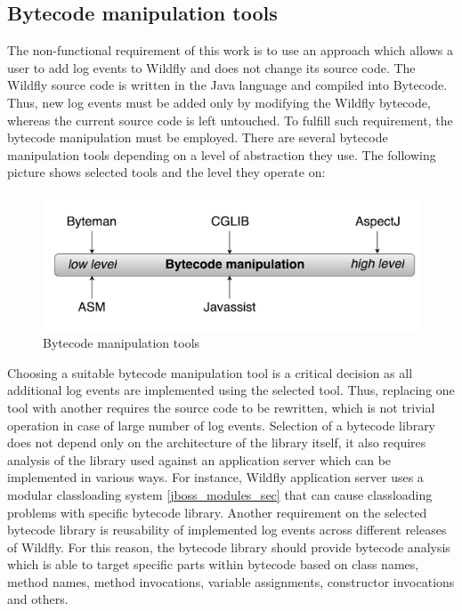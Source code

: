 \documentclass[12pt,oneside]{fithesis2}
\begin{document}
\subsection{Bytecode manipulation tools}
The non-functional requirement of this work is to use an approach which allows a user to add log events to Wildfly and does not change its source code. The Wildfly source code is written in the Java language and compiled into Bytecode. Thus, new log events must be added only by modifying the Wildfly bytecode, whereas the current source code is left untouched. To fulfill such requirement, the bytecode manipulation must be employed. There are several bytecode manipulation tools depending on a level of abstraction they use. The following picture shows selected tools and the level they operate on:
\begin{figure}[ht!]
	\centering
	\includegraphics[width=\textwidth]{images/bytecode_tools}
	\caption{Bytecode manipulation tools}
	\label{bytecode_tools}
\end{figure}

Choosing a suitable bytecode manipulation tool is a critical decision as all additional log events are implemented using the selected tool. Thus, replacing one tool with another requires the source code to be rewritten, which is not trivial operation in case of large number of log events. Selection of a bytecode library does not depend only on the architecture of the library itself, it also requires analysis of the library used against an application server which can be implemented in various ways. For instance, Wildfly application server uses a modular classloading system \ref{jboss_modules_sec} that can cause classloading problems with specific bytecode library. Another requirement on the selected bytecode library is reusability of implemented log events across different releases of Wildfly. For this reason, the bytecode library should provide bytecode analysis which is able to target specific parts within bytecode based on class names, method names, method invocations, variable assignments, constructor invocations and others.
\end{document}
